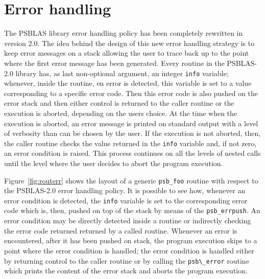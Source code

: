 \section{Error handling}

The PSBLAS library error handling policy has been completely rewritten
in version 2.0. The idea behind the design of this new error handling
strategy is to keep error messages on a stack allowing the user to
trace back up to the point where the first error message has been
generated. Every routine in the PSBLAS-2.0 library has, as last
non-optional argument, an integer \verb|info| variable; whenever,
inside the routine, en error is detected, this variable is set to a
value corresponding to a specific error code. Then this error code is
also pushed on the error stack and then either control is returned to
the caller routine or the execution is aborted, depending on the users
choice. At the time when the execution is aborted, an error message is
printed on standard output with a level of verbosity than can be
chosen by the user. If the execution is not aborted, then, the caller
routine checks the value returned in the \verb|info| variable and, if
not zero, an error condition is raised. This process continues on all the
levels of nested calls until the level where the user decides to abort
the program execution.

Figure~\ref{fig:routerr} shows the layout of a generic \verb|psb_foo|
routine with respect to the PSBLAS-2.0 error handling policy. It is
possible to see how, whenever an error condition is detected, the
\verb|info| variable is set to the corresponding error code which is,
then, pushed on top of the stack by means of the
\verb|psb_errpush|. An error condition may be directly detected inside
a routine or indirectly checking the error code returned returned by a
called routine. Whenever an error is encountered, after it has been
pushed on stack, the program execution skips to a point where the
error condition is handled; the error condition is handled either by
returning control to the caller routine or by calling the
\verb|psb\_error| routine which prints the content of the error stack
and aborts the program execution.

